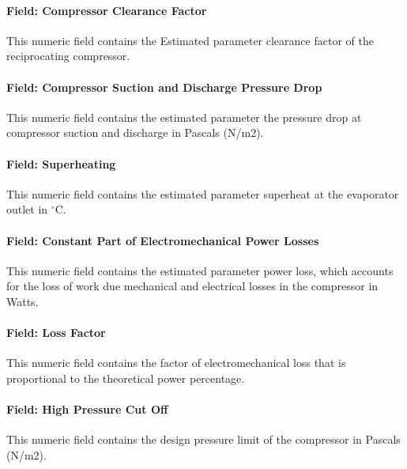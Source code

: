 \paragraph{Field: Compressor Clearance Factor}\label{field-compressor-clearance-factor-1-000}

This numeric field contains the Estimated parameter clearance factor of the reciprocating compressor.

\paragraph{Field: Compressor Suction and Discharge Pressure Drop}\label{field-compressor-suction-and-discharge-pressure-drop-1}

This numeric field contains the estimated parameter the pressure drop at compressor suction and discharge in Pascals (N/m2).

\paragraph{Field: Superheating}\label{field-superheating-1}

This numeric field contains the estimated parameter superheat at the evaporator outlet in $^\circ$C.

\paragraph{Field: Constant Part of Electromechanical Power Losses}\label{field-constant-part-of-electromechanical-power-losses-1}

This numeric field contains the estimated parameter power loss, which accounts for the loss of work due mechanical and electrical losses in the compressor in Watts.

\paragraph{Field: Loss Factor}\label{field-loss-factor-1}

This numeric field contains the factor of electromechanical loss that is proportional to the theoretical power percentage.

\paragraph{Field: High Pressure Cut Off}\label{field-high-pressure-cut-off-1}

This numeric field contains the design pressure limit of the compressor in Pascals (N/m2).

